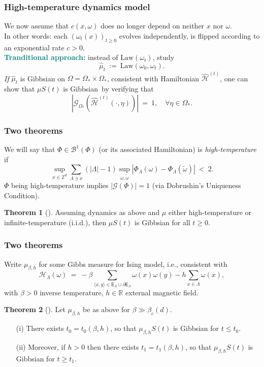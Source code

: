 \documentclass{beamer}
\newcommand{\BB}{\mathscr{B}}
\newcommand{\E}{\mathsf{E}}
\newcommand{\G}{\mathcal{G}}
\renewcommand{\H}{\mathcal{H}}
\newcommand{\Z}{\mathbb{Z}}
\newcommand{\pika}{\boldsymbol{\cdot}}
\newcommand{\1}{\mathbbm{1}}
\renewcommand{\sp}[1]{\langle #1\rangle}
\newcommand{\5}{\vspace{0.5cm}}
\newcommand{\3}{\vspace{0.3cm}}
\theoremstyle{definition}
\newtheorem{thm}{Theorem}[section]
\begin{document}
\begin{frame}
\frametitle{High-temperature dynamics model}
We now assume that $c(x,\omega)$ does no longer depend on neither $x$ nor $\omega$. \\\vspace*{0.5cm}\pause
In other words: each $(\omega_t(x))_{t\geq 0}$ evolves independently, is flipped according to an exponential rate $c>0$.\\\vspace{0.5cm}\pause
\textcolor{teal}{\textbf{Tranditional approach:}} instead of $\mathrm{Law}(\omega_t)$, study
$$\hat{\mu}_t ~:=~ \mathrm{Law}(\omega_0,\omega_t).$$\pause
\textit{If} $\hat{\mu}_t$ is Gibbsian on $\Omega=\Omega_*\times\Omega_*$, consistent with Hamiltonian $\hat{\H}^{(t)}$, one can show that $\mu S(t)$ is Gibbsian\pause~by verifying that
$$|\G_{\Omega_*}(\hat{\H}^{(t)}(\pika,\eta))| ~=~ 1, \quad \forall \eta\in\Omega_*.$$
\end{frame}


\begin{frame}
\frametitle{Two theorems}
We will say that $\Phi\in\BB^1(\Phi)$ (or its associated Hamiltonian) is \textit{high-temperature} if
$$\sup_{x\in\Z^d}\sum_{\Lambda\ni x}(|\Lambda|-1)\sup_{\omega,\tilde{\omega}}|\Phi_\Lambda(\omega)-\Phi_\Lambda(\tilde{\omega})| ~<~ 2.$$\pause
$\Phi$ being high-temperature implies $|\G(\Phi)|=1$ (via Dobrushin's Uniqueness Condition). \pause
\begin{thm}[\cite{EFHR}]
Assuming dynamics as above and $\mu$ either high-temperature or infinite-temperature (i.i.d.), then $\mu S(t)$ is Gibbsian for all $t\geq 0$.
\end{thm}
\end{frame}

\begin{frame}
\frametitle{Two theorems}
Write $\mu_{\beta,h}$ for some Gibbs measure for Ising model, i.e., consistent with 
$$\H_\Lambda(\omega) ~=~ -\beta\!\!\sum_{\sp{x,y}\in\E_\Lambda\cup\partial\E_\Lambda}\!\!\!\omega(x)\omega(y) - h\sum_{x\in\Lambda}\omega(x),$$
with $\beta>0$ inverse temperature, $h\in\mathbb{R}$ external magnetic field.\pause
\begin{thm}[\cite{EFHR}]
Let $\mu_{\beta,h}$ be as above for $\beta\gg\beta_c(d)$.\pause
\begin{itemize}
	\item[(i)] There exists $t_0=t_0(\beta,h)$, so that $\mu_{\beta,h}S(t)$ is Gibbsian for $t\leq t_0$.\pause
	\item[(ii)] Moreover, if $h>0$ then there exists $t_1=t_1(\beta,h)$, so that $\mu_{\beta,h}S(t)$ is Gibbsian for $t\geq t_1$.
\end{itemize}
\end{thm}
\end{frame}
\end{document}
